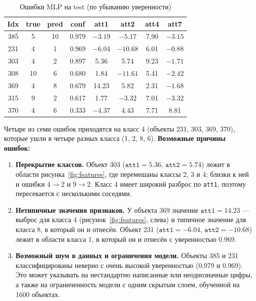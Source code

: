 \documentclass[oneside,a4paper,14pt]{extarticle}
\begin{document}
\begin{table}[ht]
\centering
\begin{tabular}{cccccccc}
\toprule
Idx & true & pred & conf & att1 & att2 & att4 & att7 \\
\midrule
385 & 5 & 10 & 0.979 & $-3.19$ & $-5.17$ & 7.90 & $-3.15$ \\
231 & 4 & 1 & 0.969 & $-6.04$ & $-10.68$ & 6.01 & $-0.88$ \\
303 & 4 & 2 & 0.897 & 5.36 & 5.74 & 9.23 & $-1.71$ \\
308 & 10 & 6 & 0.680 & 1.84 & $-11.61$ & 5.41 & $-2.42$ \\
369 & 4 & 8 & 0.679 & 14.23 & 5.82 & 2.31 & $-1.68$ \\
315 & 9 & 2 & 0.617 & 1.77 & $-3.32$ & 7.01 & $-3.32$ \\
370 & 4 & 6 & 0.333 & $-4.37$ & 4.43 & 7.71 & 8.81 \\
\bottomrule
\end{tabular}
\caption{Ошибки MLP на test (по убыванию уверенности)}
\label{tab:err}
\end{table}

Четыре из семи ошибок приходятся на класс 4 (объекты 231, 303, 369, 370), которые ушли в четыре разных класса (1, 2, 8, 6). \textbf{Возможные причины ошибок:}
\begin{enumerate}
    \item \textbf{Перекрытие классов.} Объект 303 ($\texttt{att1}=5.36$, $\texttt{att2}=5.74$) лежит в области рисунка~\ref{fig:features}, где перемешаны классы 2, 3 и 4; близки к ней и ошибки 4$\to$2 и 9$\to$2. Класс 4 имеет широкий разброс по \texttt{att1}, поэтому пересекается с несколькими соседями.
    \item \textbf{Нетипичные значения признаков.} У объекта 369 значение $\texttt{att1}=14.23$ --- выброс для класса 4 (рисунок~\ref{fig:features}, слева) и типичное значение для класса 8, в который он и отнесён. Объект 231 ($\texttt{att1}=-6.04$, $\texttt{att2}=-10.68$) лежит в области класса 1, в который он и отнесён с уверенностью 0.969.
    \item \textbf{Возможный шум в данных и ограничения модели.} Объекты 385 и 231 классифицированы неверно с очень высокой уверенностью (0.979 и 0.969). Это может указывать на нестандартно написанные или неоднозначные цифры, а также на ограниченность модели с одним скрытым слоем, обученной на 1600 объектах.
\end{enumerate}
\end{document}
